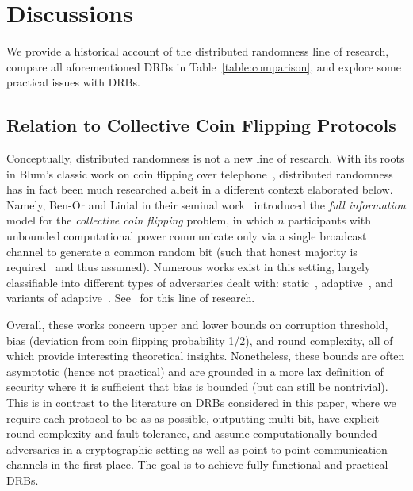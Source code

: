 
\section{Discussions}
\label{section:discussions}
We provide a historical account of the distributed randomness line of research, compare all aforementioned DRBs in Table~\ref{table:comparison}, and explore some practical issues with DRBs.

\subsection{Relation to Collective Coin Flipping Protocols}
Conceptually, distributed randomness is not a new line of research.
With its roots in Blum's classic work on coin flipping over telephone~\cite{blum1983coin}, distributed randomness has in fact been much researched albeit in a different context elaborated below.
Namely, Ben-Or and Linial in their seminal work~\cite{ben1985collective,ben1989collective} introduced the \textit{full information} model for the \textit{collective coin flipping} problem, in which $n$ participants with unbounded computational power communicate only via a single broadcast channel to generate a common random bit (such that honest majority is required~\cite{saks1989robust,boppana2000perfect} and thus assumed).
Numerous works exist in this setting, largely classifiable into different types of adversaries dealt with: static~\cite{ben1989collective,ajtai1993influence,kahn1989influence,saks1989robust,alon1993coin,boppana2000perfect,feige1999noncryptographic,russell1999lower}, adaptive~\cite{ben1989collective,lichtenstein1989some,goldwasser2015adaptively,dodis2000impossibility,kalai2021lower,haitner2020tight}, and variants of adaptive~\cite{mahloujifar2019can,etesami2020computational,cleve1993martingales,aspnes1998lower,goldwasser2015adaptively}.
See~\cite{kalai2021lower,haitner2020tight} for this line of research.

Overall, these works concern upper and lower bounds on corruption threshold, bias (deviation from coin flipping probability 1/2), and round complexity, all of which provide interesting theoretical insights.
Nonetheless, these bounds are often asymptotic (hence not practical) and are grounded in a more lax definition of security where it is sufficient that bias is bounded (but can still be nontrivial).
This is in contrast to the literature on DRBs considered in this paper, where we require each protocol to be as \drbsecure as possible, outputting multi-bit, have explicit round complexity and fault tolerance, and assume computationally bounded adversaries in a cryptographic setting as well as point-to-point communication channels in the first place.
The goal is to achieve fully functional and practical DRBs.

